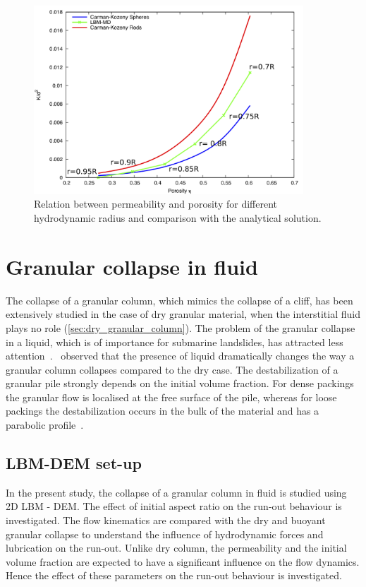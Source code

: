 \begin{figure}[htpb]
\centering
\includegraphics[width=0.9\textwidth]{Carman}
\caption{Relation between permeability and porosity for 
different hydrodynamic radius and comparison with the analytical solution.}
\label{fig:Carman}
\end{figure}


\section{Granular collapse in fluid}

The collapse of a granular column, which mimics the
collapse of a cliff, has been extensively studied in the case of
dry granular material, when the interstitial fluid plays no
role (\cref{sec:dry_granular_column}). The problem of the granular collapse 
in a liquid, which is of importance for submarine landslides, has attracted 
less attention~\citep{Rondon2011}.~\citet{Thompson2007} 
observed that the presence of liquid dramatically changes the way a granular 
column collapses compared to the dry case. The destabilization of a granular 
pile strongly depends on the initial volume fraction. For dense 
packings the granular flow is localised at the free surface of the pile, 
whereas for loose packings the destabilization occurs in the bulk of the
material and has a parabolic profile~\citep{Bonnet2010,Topin2011,Iverson2000}. 

\subsection{LBM-DEM set-up}

In the present study, the collapse of a granular column in fluid is studied 
using 2D LBM - DEM. The effect of initial aspect ratio on the run-out behaviour 
is investigated. The flow kinematics are compared with the dry and buoyant 
granular collapse to understand the influence of hydrodynamic forces and 
lubrication on the run-out. Unlike dry column, the permeability and the 
initial volume fraction are expected to have a significant influence on the 
flow dynamics. Hence the effect of these parameters on the run-out behaviour 
is investigated.

